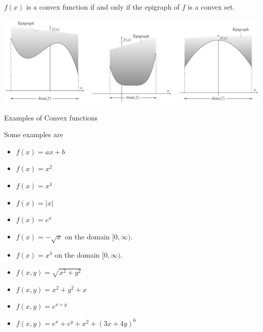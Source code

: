 \documentclass[../open-optimization/open-optimization.tex]{subfiles}
\begin{document}
\begin{theorem}
$f(x)$ is a convex function if and only if the epigraph of $f$ is a convex set.
\end{theorem}

\includegraphics[scale = 0.7]{epigraph.pdf}\footnotemark




\begin{example}{Examples of Convex functions}{}

Some examples are 

\begin{itemize}
\item $f(x) = ax + b$
\item $f(x) = x^2$
\item $f(x) = x^4$
\item $f(x) = |x|$
\item $f(x) = e^x$
\item $f(x) = - \sqrt{x}$ on the domain $[0,\infty)$.
\item $f(x) = x^3$ on the domain $[0,\infty)$.
\item $f(x,y) = 
\sqrt{x^2 + y^2}$
\item $f(x,y) = x^2 + y^2 + x$
\item $ f(x,y) = e^{x+y}$
\item $f(x,y) = e^{x} + e^{y} + x^2+  (3x + 4y)^6$
\end{itemize}

\end{example}
\end{document}
